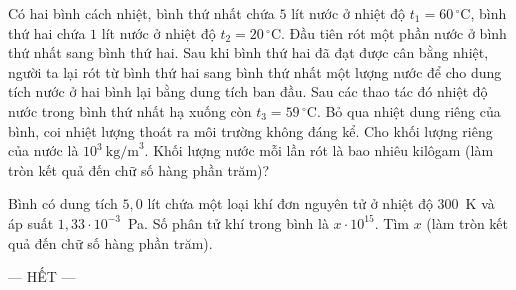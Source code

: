 	\begin{ex}%
		Có hai bình cách nhiệt, bình thứ nhất chứa $5$ lít nước ở nhiệt độ $t_1=60\,^\circ\text{C}$, bình thứ hai chứa $1$ lít nước ở nhiệt độ $t_2=20\,^\circ\text{C}$. Đầu tiên rót một phần nước ở bình thứ nhất sang bình thứ hai. Sau khi bình thứ hai đã đạt được cân bằng nhiệt, người ta lại rót từ bình thứ hai sang bình thứ nhất một lượng nước để cho dung tích nước ở hai bình lại bằng dung tích ban đầu. Sau các thao tác đó nhiệt độ nước trong bình thứ nhất hạ xuống còn $t_3=59\,^\circ\text{C}$. Bỏ qua nhiệt dung riêng của bình, coi nhiệt lượng thoát ra môi trường không đáng kể. Cho khối lượng riêng của nước là $10^3~\text{kg/m}^3$. Khối lượng nước mỗi lần rót là bao nhiêu kilôgam (làm tròn kết quả đến chữ số hàng phần trăm)?
		\par
	\end{ex}

	\begin{ex}%
		Bình có dung tích $5{,}0$ lít chứa một loại khí đơn nguyên tử ở nhiệt độ $300$~K và áp suất $1{,}33\cdot 10^{-3}$~Pa. Số phân tử khí trong bình là $x\cdot 10^{15}$. Tìm $x$ (làm tròn kết quả đến chữ số hàng phần trăm).
		\par
	\end{ex}

	\centerline{--- HẾT ---}


